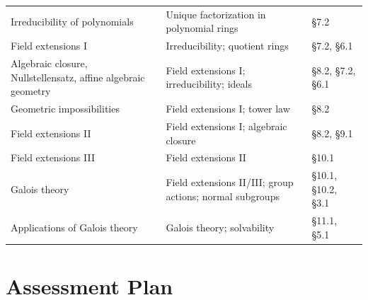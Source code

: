 \documentclass{article}
\begin{document}
\begin{longtable}{p{5cm} p{5cm} p{4.5cm}}
Irreducibility of polynomials & Unique factorization in polynomial rings & \S7.2 \\
Field extensions I & Irreducibility; quotient rings & \S7.2, \S6.1 \\
Algebraic closure, Nullstellensatz, affine algebraic geometry & Field extensions I; irreducibility; ideals & \S8.2, \S7.2, \S6.1 \\
Geometric impossibilities & Field extensions I; tower law & \S8.2 \\
Field extensions II & Field extensions I; algebraic closure & \S8.2, \S9.1 \\
Field extensions III & Field extensions II & \S10.1 \\
Galois theory & Field extensions II/III; group actions; normal subgroups & \S10.1, \S10.2, \S3.1 \\
Applications of Galois theory & Galois theory; solvability & \S11.1, \S5.1 \\
\bottomrule
\end{longtable}

\section{Assessment Plan}
\end{document}
